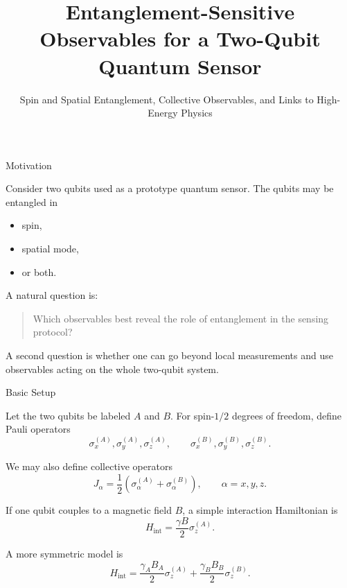 \documentclass{beamer}
\title{Entanglement-Sensitive Observables for a Two-Qubit Quantum Sensor}
\subtitle{Spin and Spatial Entanglement, Collective Observables, and Links to High-Energy Physics}
\author{}
\date{}
\begin{document}
\begin{frame}
  \titlepage
\end{frame}

\begin{frame}{Motivation}

Consider two qubits used as a prototype quantum sensor.
The qubits may be entangled in
\begin{itemize}
    \item spin,
    \item spatial mode,
    \item or both.
\end{itemize}

A natural question is:
\begin{quote}
Which observables best reveal the role of entanglement in the sensing protocol?
\end{quote}

A second question is whether one can go beyond local measurements and use
observables acting on the whole two-qubit system.

\end{frame}

\begin{frame}{Basic Setup}

Let the two qubits be labeled $A$ and $B$.
For spin-$1/2$ degrees of freedom, define Pauli operators
\[
\sigma_x^{(A)},\sigma_y^{(A)},\sigma_z^{(A)},\qquad
\sigma_x^{(B)},\sigma_y^{(B)},\sigma_z^{(B)}.
\]

We may also define collective operators
\[
J_\alpha = \frac{1}{2}\left(\sigma_\alpha^{(A)}+\sigma_\alpha^{(B)}\right),
\qquad \alpha=x,y,z.
\]

If one qubit couples to a magnetic field $B$, a simple interaction Hamiltonian is
\[
H_{\mathrm{int}} = \frac{\gamma B}{2}\sigma_z^{(A)}.
\]

A more symmetric model is
\[
H_{\mathrm{int}} = \frac{\gamma_A B_A}{2}\sigma_z^{(A)}+
\frac{\gamma_B B_B}{2}\sigma_z^{(B)}.
\]

\end{frame}
\end{document}

